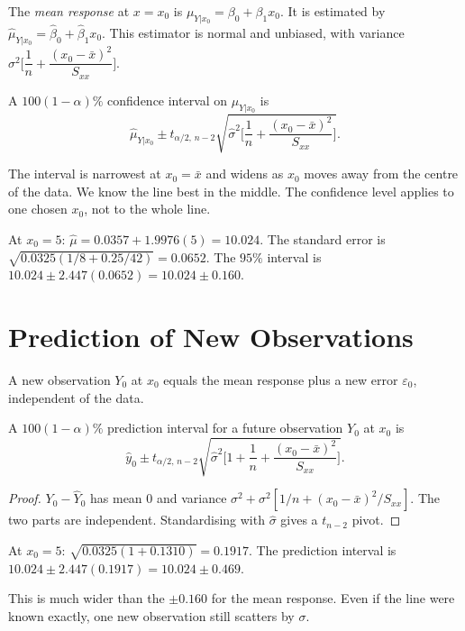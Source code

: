 The \emph{mean response} at $x=x_0$ is $\mu_{Y|x_0}=\beta_0+\beta_1x_0$. It is estimated by $\hat\mu_{Y|x_0}=\hat\beta_0+\hat\beta_1x_0$. This estimator is normal and unbiased, with variance $\sigma^2\Big[\dfrac1n+\dfrac{(x_0-\bar{x})^2}{S_{xx}}\Big]$.

\begin{theorem}\label{thm:meanresp}
A $100(1-\alpha)\%$ confidence interval on $\mu_{Y|x_0}$ is
\[ \hat\mu_{Y|x_0}\pm t_{\alpha/2,\,n-2}\sqrt{\hat\sigma^2\Big[\frac1n+\frac{(x_0-\bar{x})^2}{S_{xx}}\Big]}. \]
\end{theorem}

The interval is narrowest at $x_0=\bar{x}$ and widens as $x_0$ moves away from the centre of the data. We know the line best in the middle. The confidence level applies to one chosen $x_0$, not to the whole line.

\begin{example}
At $x_0=5$: $\hat\mu=0.0357+1.9976(5)=10.024$. The standard error is $\sqrt{0.0325(1/8+0.25/42)}=0.0652$. The $95\%$ interval is $10.024\pm2.447(0.0652)=10.024\pm0.160$.
\end{example}

\section{Prediction of New Observations}

A new observation $Y_0$ at $x_0$ equals the mean response plus a new error $\varepsilon_0$, independent of the data.

\begin{theorem}\label{thm:regpi}
A $100(1-\alpha)\%$ prediction interval for a future observation $Y_0$ at $x_0$ is
\[ \hat{y}_0\pm t_{\alpha/2,\,n-2}\sqrt{\hat\sigma^2\Big[1+\frac1n+\frac{(x_0-\bar{x})^2}{S_{xx}}\Big]}. \]
\end{theorem}

\begin{proof}
$Y_0-\hat{Y}_0$ has mean $0$ and variance $\sigma^2+\sigma^2[1/n+(x_0-\bar{x})^2/S_{xx}]$. The two parts are independent. Standardising with $\hat\sigma$ gives a $t_{n-2}$ pivot.
\end{proof}

\begin{example}
At $x_0=5$: $\sqrt{0.0325(1+0.1310)}=0.1917$. The prediction interval is $10.024\pm2.447(0.1917)=10.024\pm0.469$.

This is much wider than the $\pm0.160$ for the mean response. Even if the line were known exactly, one new observation still scatters by $\sigma$.
\end{example}

